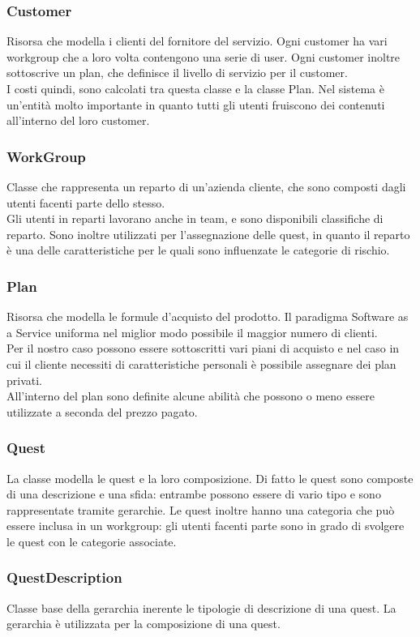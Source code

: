 {{\subsubsection{Customer} Risorsa che modella i clienti del fornitore del servizio. Ogni customer ha vari workgroup che a loro volta contengono una serie di user. Ogni customer inoltre sottoscrive un plan, che definisce il livello di servizio per il customer.\\
I costi quindi, sono calcolati tra questa classe e la classe Plan. Nel sistema è un'entità molto importante in quanto tutti gli utenti fruiscono dei contenuti all’interno del loro customer.\\
\subsubsection{WorkGroup} Classe che rappresenta un reparto di un’azienda cliente, che sono composti dagli utenti facenti parte dello stesso.\\
Gli utenti in reparti lavorano anche in team, e sono disponibili classifiche di reparto. Sono inoltre utilizzati per l’assegnazione delle quest, in quanto il reparto è una delle caratteristiche per le quali sono influenzate le categorie di rischio.
\subsubsection{Plan}Risorsa che modella le formule d’acquisto del prodotto. Il paradigma Software as a Service uniforma nel miglior modo possibile il maggior numero di clienti.\\
Per il nostro caso possono essere sottoscritti vari piani di acquisto e nel caso in cui il cliente necessiti di caratteristiche personali è possibile assegnare dei plan privati.\\
All’interno del plan sono definite alcune abilità che possono o meno essere utilizzate a seconda del prezzo pagato.
\subsubsection{Quest} La classe modella le quest e la loro composizione. Di fatto le quest sono composte di una descrizione e una sfida: entrambe possono essere di vario tipo e sono rappresentate tramite gerarchie.
Le quest inoltre hanno una categoria che può essere inclusa in un workgroup: gli utenti facenti parte sono in grado di svolgere le quest con le categorie associate.
\subsubsection{QuestDescription}Classe base della gerarchia inerente le tipologie di descrizione di una quest. La gerarchia è utilizzata per la composizione di una quest.
}}
